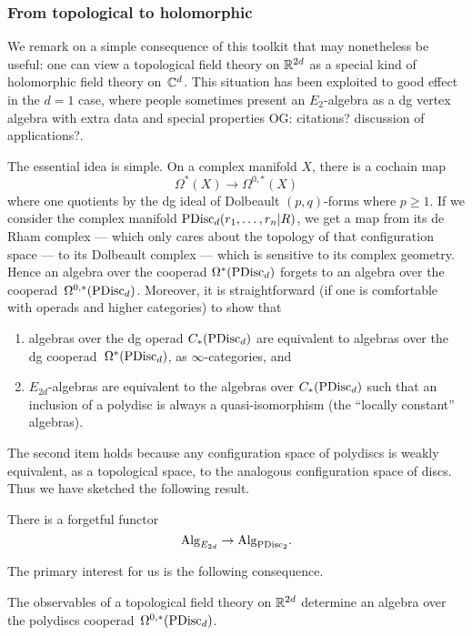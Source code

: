 \documentclass[11pt]{amsart}
\def\owen#1{{\textcolor{violet!65!black}{OG: {#1}}}}
\begin{document}
\subsubsection{From topological to holomorphic}

We remark on a simple consequence of this toolkit that may nonetheless be useful:
one can view a topological field theory on $\mathbb R^{2d}$ as a special kind of holomorphic field theory on~$\mathbb C^{d}$.
This situation has been exploited to good effect in the $d=1$ case,
where people sometimes present an $E_2$-algebra as a dg vertex algebra with extra data and special properties \owen{citations? discussion of applications?}.

The essential idea is simple.
On a complex manifold $X$, there is a cochain map
\[
\Omega^*(X) \to \Omega^{0,*}(X)
\]
where one quotients by the dg ideal of Dolbeault $(p,q)$-forms where $p \geq 1$.
If we consider the complex manifold ${\rm PDisc}_d(r_1,\ldots,r_n|R)$, 
we get a map from its de Rham complex --- which only cares about the topology of that configuration space --- to its Dolbeault complex --- which is sensitive to its complex geometry.
Hence an algebra over the cooperad $\Omega^*({\rm PDisc}_d)$ forgets to an algebra over the cooperad~$\Omega^{0,*}({\rm PDisc}_d)$.
Moreover, it is straightforward (if one is comfortable with operads and higher categories) to show that 
\begin{enumerate}
\item algebras over the dg operad $C_*({\rm PDisc}_d)$ are equivalent to algebras over the dg cooperad~$\Omega^*({\rm PDisc}_d)$, as $\infty$-categories, and
\item $E_{2d}$-algebras are equivalent to the algebras over $C_*({\rm PDisc}_d)$ such that an inclusion of a polydisc is always a quasi-isomorphism (the ``locally constant'' algebras).
\end{enumerate}
The second item holds because any configuration space of polydiscs is weakly equivalent, as a topological space, to the analogous configuration space of discs.
Thus we have sketched the following result.

\begin{thm}
There is a forgetful functor
\[
{\rm Alg}_{E_{2d}} \to  {\rm Alg}_{{\rm PDisc}_2}.
\]
\end{thm}

The primary interest for us is the following consequence.

\begin{cor}
The observables of a topological field theory on $\mathbb R^{2d}$ determine an algebra over the polydiscs cooperad~$\Omega^{0,*}({\rm PDisc}_d)$.
\end{cor}
\end{document}
